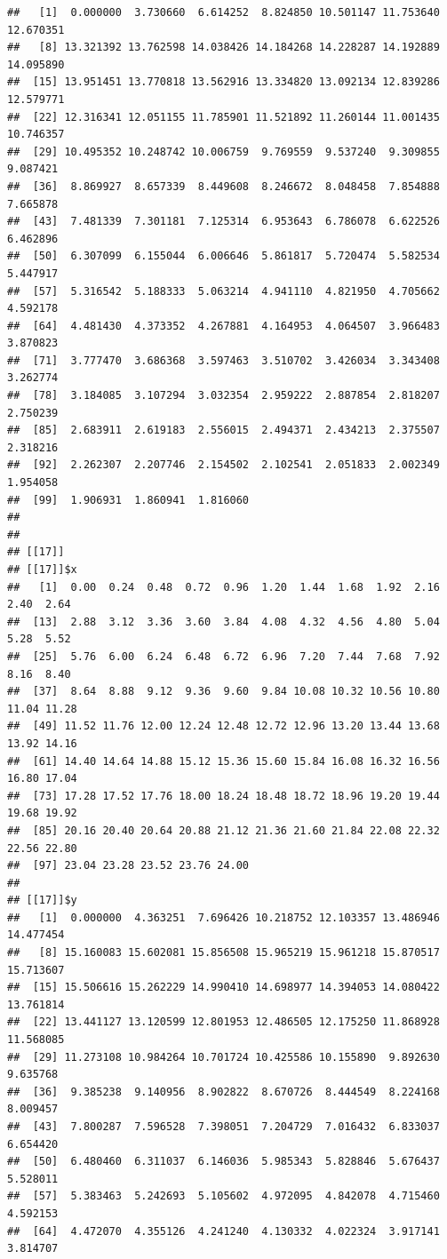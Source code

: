 \documentclass[
  ignorenonframetext,
]{beamer}
\begin{document}
\begin{frame}[fragile]{}
\begin{verbatim}
##   [1]  0.000000  3.730660  6.614252  8.824850 10.501147 11.753640 12.670351
##   [8] 13.321392 13.762598 14.038426 14.184268 14.228287 14.192889 14.095890
##  [15] 13.951451 13.770818 13.562916 13.334820 13.092134 12.839286 12.579771
##  [22] 12.316341 12.051155 11.785901 11.521892 11.260144 11.001435 10.746357
##  [29] 10.495352 10.248742 10.006759  9.769559  9.537240  9.309855  9.087421
##  [36]  8.869927  8.657339  8.449608  8.246672  8.048458  7.854888  7.665878
##  [43]  7.481339  7.301181  7.125314  6.953643  6.786078  6.622526  6.462896
##  [50]  6.307099  6.155044  6.006646  5.861817  5.720474  5.582534  5.447917
##  [57]  5.316542  5.188333  5.063214  4.941110  4.821950  4.705662  4.592178
##  [64]  4.481430  4.373352  4.267881  4.164953  4.064507  3.966483  3.870823
##  [71]  3.777470  3.686368  3.597463  3.510702  3.426034  3.343408  3.262774
##  [78]  3.184085  3.107294  3.032354  2.959222  2.887854  2.818207  2.750239
##  [85]  2.683911  2.619183  2.556015  2.494371  2.434213  2.375507  2.318216
##  [92]  2.262307  2.207746  2.154502  2.102541  2.051833  2.002349  1.954058
##  [99]  1.906931  1.860941  1.816060
## 
## 
## [[17]]
## [[17]]$x
##   [1]  0.00  0.24  0.48  0.72  0.96  1.20  1.44  1.68  1.92  2.16  2.40  2.64
##  [13]  2.88  3.12  3.36  3.60  3.84  4.08  4.32  4.56  4.80  5.04  5.28  5.52
##  [25]  5.76  6.00  6.24  6.48  6.72  6.96  7.20  7.44  7.68  7.92  8.16  8.40
##  [37]  8.64  8.88  9.12  9.36  9.60  9.84 10.08 10.32 10.56 10.80 11.04 11.28
##  [49] 11.52 11.76 12.00 12.24 12.48 12.72 12.96 13.20 13.44 13.68 13.92 14.16
##  [61] 14.40 14.64 14.88 15.12 15.36 15.60 15.84 16.08 16.32 16.56 16.80 17.04
##  [73] 17.28 17.52 17.76 18.00 18.24 18.48 18.72 18.96 19.20 19.44 19.68 19.92
##  [85] 20.16 20.40 20.64 20.88 21.12 21.36 21.60 21.84 22.08 22.32 22.56 22.80
##  [97] 23.04 23.28 23.52 23.76 24.00
## 
## [[17]]$y
##   [1]  0.000000  4.363251  7.696426 10.218752 12.103357 13.486946 14.477454
##   [8] 15.160083 15.602081 15.856508 15.965219 15.961218 15.870517 15.713607
##  [15] 15.506616 15.262229 14.990410 14.698977 14.394053 14.080422 13.761814
##  [22] 13.441127 13.120599 12.801953 12.486505 12.175250 11.868928 11.568085
##  [29] 11.273108 10.984264 10.701724 10.425586 10.155890  9.892630  9.635768
##  [36]  9.385238  9.140956  8.902822  8.670726  8.444549  8.224168  8.009457
##  [43]  7.800287  7.596528  7.398051  7.204729  7.016432  6.833037  6.654420
##  [50]  6.480460  6.311037  6.146036  5.985343  5.828846  5.676437  5.528011
##  [57]  5.383463  5.242693  5.105602  4.972095  4.842078  4.715460  4.592153
##  [64]  4.472070  4.355126  4.241240  4.130332  4.022324  3.917141  3.814707

\end{verbatim}
\end{frame}
\end{document}
